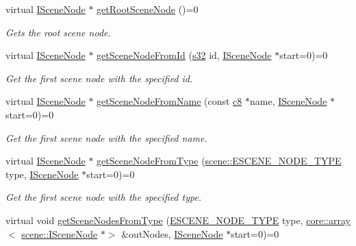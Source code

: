 \begin{DoxyCompactItemize}
virtual \hyperlink{classirr_1_1scene_1_1ISceneNode}{I\+Scene\+Node} $\ast$ \hyperlink{classirr_1_1scene_1_1ISceneManager_a4f7075320f1a3bf2838f29c23f78635f}{get\+Root\+Scene\+Node} ()=0
\begin{DoxyCompactList}\small\item\em Gets the root scene node. \end{DoxyCompactList}\item 
virtual \hyperlink{classirr_1_1scene_1_1ISceneNode}{I\+Scene\+Node} $\ast$ \hyperlink{classirr_1_1scene_1_1ISceneManager_a038e2afb1397fe8f2b6f8f6c55d52b55}{get\+Scene\+Node\+From\+Id} (\hyperlink{namespaceirr_ac66849b7a6ed16e30ebede579f9b47c6}{s32} id, \hyperlink{classirr_1_1scene_1_1ISceneNode}{I\+Scene\+Node} $\ast$start=0)=0
\begin{DoxyCompactList}\small\item\em Get the first scene node with the specified id. \end{DoxyCompactList}\item 
virtual \hyperlink{classirr_1_1scene_1_1ISceneNode}{I\+Scene\+Node} $\ast$ \hyperlink{classirr_1_1scene_1_1ISceneManager_a13ada3cca4b9eadee5e8ba3ccb6683da}{get\+Scene\+Node\+From\+Name} (const \hyperlink{namespaceirr_a9395eaea339bcb546b319e9c96bf7410}{c8} $\ast$name, \hyperlink{classirr_1_1scene_1_1ISceneNode}{I\+Scene\+Node} $\ast$start=0)=0
\begin{DoxyCompactList}\small\item\em Get the first scene node with the specified name. \end{DoxyCompactList}\item 
virtual \hyperlink{classirr_1_1scene_1_1ISceneNode}{I\+Scene\+Node} $\ast$ \hyperlink{classirr_1_1scene_1_1ISceneManager_a5ab8e8f8cc8456a3ea881c75dfe505bb}{get\+Scene\+Node\+From\+Type} (\hyperlink{namespaceirr_1_1scene_acad3d7ef92a9807d391ba29120f3b7bd}{scene\+::\+E\+S\+C\+E\+N\+E\+\_\+\+N\+O\+D\+E\+\_\+\+T\+Y\+PE} type, \hyperlink{classirr_1_1scene_1_1ISceneNode}{I\+Scene\+Node} $\ast$start=0)=0
\begin{DoxyCompactList}\small\item\em Get the first scene node with the specified type. \end{DoxyCompactList}\item 
virtual void \hyperlink{classirr_1_1scene_1_1ISceneManager_aa920cb095fc901273fd097a39ebc3255}{get\+Scene\+Nodes\+From\+Type} (\hyperlink{namespaceirr_1_1scene_acad3d7ef92a9807d391ba29120f3b7bd}{E\+S\+C\+E\+N\+E\+\_\+\+N\+O\+D\+E\+\_\+\+T\+Y\+PE} type, \hyperlink{classirr_1_1core_1_1array}{core\+::array}$<$ \hyperlink{classirr_1_1scene_1_1ISceneNode}{scene\+::\+I\+Scene\+Node} $\ast$$>$ \&out\+Nodes, \hyperlink{classirr_1_1scene_1_1ISceneNode}{I\+Scene\+Node} $\ast$start=0)=0
$$
\end{DoxyCompactItemize}
